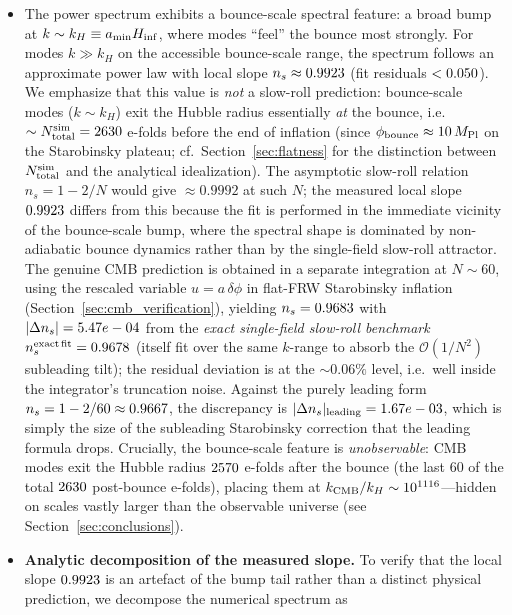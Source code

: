 \documentclass[11pt,a4paper]{article}
\begin{document}
\begin{itemize}
\item The power spectrum exhibits a bounce-scale spectral feature: a broad bump at $k \sim k_H \equiv a_{\rm min} H_{\rm inf}$, where modes ``feel'' the bounce most strongly. For modes $k \gg k_H$ on the accessible bounce-scale range, the spectrum follows an approximate power law with local slope $n_s \approx 0.9923$ (fit residuals $< 0.050$). We emphasize that this value is \emph{not} a slow-roll prediction: bounce-scale modes ($k \sim k_H$) exit the Hubble radius essentially \emph{at} the bounce, i.e.~$\sim N_{\rm total}^{\rm sim} = 2630$ e-folds before the end of inflation (since $\phi_{\rm bounce} \approx 10\,M_{\rm Pl}$ on the Starobinsky plateau; cf.\ Section~\ref{sec:flatness} for the distinction between $N_{\rm total}^{\rm sim}$ and the analytical idealization). The asymptotic slow-roll relation $n_s = 1 - 2/N$ would give $\approx 0.9992$ at such $N$; the measured local slope $0.9923$ differs from this because the fit is performed in the immediate vicinity of the bounce-scale bump, where the spectral shape is dominated by non-adiabatic bounce dynamics rather than by the single-field slow-roll attractor. The genuine CMB prediction is obtained in a separate integration at $N \sim 60$, using the rescaled variable $u = a\,\delta\phi$ in flat-FRW Starobinsky inflation (Section~\ref{sec:cmb_verification}), yielding $n_s = 0.9683$ with $|\Delta n_s| = 5.47e-04$ from the \emph{exact single-field slow-roll benchmark} $n_s^{\rm exact\,fit} = 0.9678$ (itself fit over the same $k$-range to absorb the $\mathcal{O}(1/N^2)$ subleading tilt); the residual deviation is at the $\sim 0.06\%$ level, i.e.\ well inside the integrator's truncation noise.  Against the purely leading form $n_s = 1 - 2/60 \approx 0.9667$, the discrepancy is $|\Delta n_s|_{\rm leading} = 1.67e-03$, which is simply the size of the subleading Starobinsky correction that the leading formula drops. Crucially, the bounce-scale feature is \emph{unobservable}: CMB modes exit the Hubble radius $2570$ e-folds after the bounce (the last 60 of the total $2630$ post-bounce e-folds), placing them at $k_{\rm CMB}/k_H \sim 10^{1116}$---hidden on scales vastly larger than the observable universe (see Section~\ref{sec:conclusions}).
\item \textbf{Analytic decomposition of the measured slope.} To verify that the local slope $0.9923$ is an artefact of the bump tail rather than a distinct physical prediction, we decompose the numerical spectrum as

\end{itemize}
\end{document}
